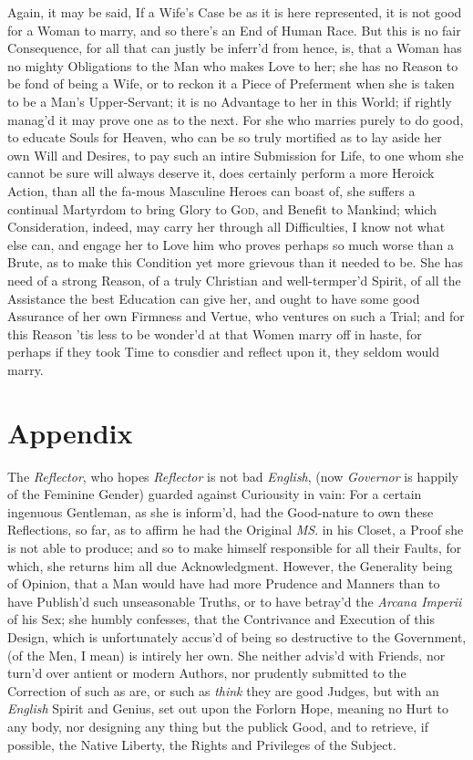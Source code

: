 Again, it may be said, If a Wife's Case be as it is here represented,
it is not good for a Woman to marry, and so there's an End of Human
Race. But this is no fair Consequence, for all that can justly be
inferr'd from hence, is, that a Woman has no mighty Obligations to the
Man who makes Love to her; she has no Reason to be fond of being a
Wife, or to reckon it a Piece of Preferment when she is taken to be a
Man's Upper-Servant; it is no Advantage to her in this World; if
rightly manag'd it may prove one as to the next. For she who marries
purely to do good, to educate Souls for Heaven, who can be so truly
mortified as to lay aside her own Will and Desires, to pay such an
intire Submission for Life, to one whom she cannot be sure will always
deserve it, does certainly perform a more Heroick Action, than all the
fa-mous Masculine Heroes can boast of, she suffers a
continual Martyrdom to bring Glory to \textsc{God}, and Benefit to
Mankind; which Consideration, indeed, may carry her through all
Difficulties, I know not what else can, and engage her to Love him who
proves perhaps so much worse than a Brute, as to make this Condition
yet more grievous than it needed to be. She has need of a strong
Reason, of a truly Christian and well-termper'd Spirit, of all the
Assistance the best Education can give her, and ought to have some
good Assurance of her own Firmness and Vertue, who ventures on such a
Trial; and for this Reason 'tis less to be wonder'd at that Women
marry off in haste, for perhaps if they took Time to consdier and
reflect upon it, they seldom would marry.

\section*{Appendix}

The \textit{Reflector}, who hopes \textit{Reflector} is not bad
\textit{English}, (now \textit{Governor} is happily of the Feminine
Gender) guarded against Curiousity in vain: For a certain ingenuous
Gentleman, as she is inform'd, had the Good-nature to own these
Reflections, so far, as to affirm he had the Original \textit{MS}. in
his Closet, a Proof she is not able to produce; and so to make himself
responsible for all their Faults, for which, she returns him all due
Acknowledgment. However, the Generality being of Opinion, that a Man
would have had more Prudence and Manners than to have Publish'd such
 unseasonable Truths, or to have betray'd the \textit{Arcana
Imperii} of his Sex; she humbly confesses, that the Contrivance and
Execution of this Design, which is unfortunately accus'd of being so
destructive to the Government, (of the Men, I mean) is intirely her
own. She neither advis'd with Friends, nor turn'd over antient or
modern Authors, nor prudently submitted to the Correction of such as
are, or such as \textit{think} they are good Judges, but with an
\textit{English} Spirit and Genius, set out upon the Forlorn Hope,
meaning no Hurt to any body, nor designing any thing but the publick
Good, and to retrieve, if possible, the Native Liberty, the Rights and
Privileges of the Subject.

